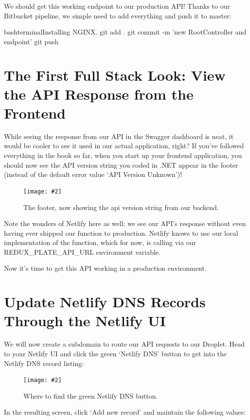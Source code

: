 \documentclass[a4paper,headinclude=on,footinclude=on,12pt,oneside]{scrbook}
\newcommand{\standardfigure}[3]{\begin{figure}[H]\begin{center}\texttt{[image: \#2]}\caption{#3}\label{fig:#2}\end{center}\end{figure}}
\begin{document}

We should get this working endpoint to our production API! Thanks to our Bitbucket pipeline, we simple need to add everything and push it to master:

\begin{codeInput}{bash}{terminal}{Installing NGINX.}
git add .
git commit -m 'new RootController and endpoint'
git push
\end{codeInput}

\section{The First Full Stack Look: View the API Response from the Frontend}

While seeing the response from our API in the Swagger dashboard is neat, it would be cooler to see it used in our actual application, right? If you've followed everything in the book so far, when you start up your frontend application, you should now see the API version string you coded in .NET appear in the footer (instead of the default error value `API Version Unknown')! 

\standardfigure{\textwidth/2}{/frontend/footer-with-api-version}{The footer, now showing the api version string from our backend.}

Note the wonders of Netlify here as well: we see our API's response without even having ever shipped our  function to production. Netlify knows to use our local implementation of the  function, which for now, is calling  via our REDUX\_PLATE\_API\_URL environment variable.

Now it's time to get this API working in a production environment.

\section{Update Netlify DNS Records Through the Netlify UI}

We will now create a subdomain to route our API requests to our Droplet. Head to your Netlify UI and click the green `Netlify DNS' button to get into the Netlify DNS record listing:

\standardfigure{\textwidth}{frontend/netlify/netlify-dns-button}{Where to find the green Netlify DNS button.}

In the resulting screen, click `Add new record' and maintain the following values:
\end{document}
